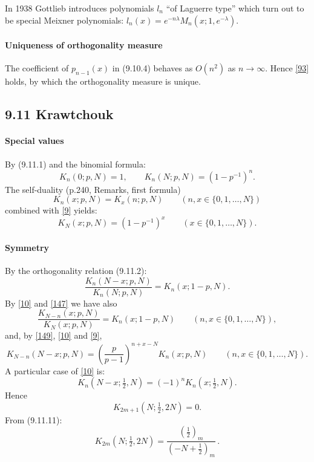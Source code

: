 \documentclass[twoside,11pt]{article}
\newcommand\la\lambda
\newcommand\thalf{\tfrac12}
\newcommand\iy\infty
\begin{document}
In 1938 Gottlieb \cite[\S2]{K1} introduces polynomials $l_n$ ``of Laguerre type''
which turn out to be special Meixner polynomials:
$l_n(x)=e^{-n\la} M_n(x;1,e^{-\la})$.
%
\paragraph{Uniqueness of orthogonality measure}
The coefficient of $p_{n-1}(x)$ in (9.10.4) behaves as $O(n^2)$ as $n\to\iy$.
Hence \eqref{93} holds, by which the orthogonality measure is unique.
%
\subsection*{9.11 Krawtchouk}
\label{sec9.11}
%
\paragraph{Special values}
By (9.11.1) and the binomial formula:
\begin{equation}
K_n(0;p,N)=1,\qquad
K_n(N;p,N)=(1-p^{-1})^n.
\label{9}
\end{equation}
The self-duality (p.240, Remarks, first formula)
\begin{equation}
K_n(x;p,N)=K_x(n;p,N)\qquad (n,x\in \{0,1,\ldots,N\})
\label{147}
\end{equation}
combined with \eqref{9} yields:
\begin{equation}
K_N(x;p,N)=(1-p^{-1})^x\qquad(x\in\{0,1,\ldots,N\}).
\label{148}
\end{equation}
%
\paragraph{Symmetry}
By the orthogonality relation (9.11.2):
\begin{equation}
\frac{K_n(N-x;p,N)}{K_n(N;p,N)}=K_n(x;1-p,N).
\label{10}
\end{equation}
By \eqref{10} and \eqref{147} we have also
\begin{equation}
\frac{K_{N-n}(x;p,N)}{K_N(x;p,N)}=K_n(x;1-p,N)
\qquad(n,x\in\{0,1,\ldots,N\}),
\label{149}
\end{equation}
and, by \eqref{149}, \eqref{10} and \eqref{9},
\begin{equation}
K_{N-n}(N-x;p,N)=\left(\frac p{p-1}\right)^{n+x-N}K_n(x;p,N)
\qquad(n,x\in\{0,1,\ldots,N\}).
\label{150}
\end{equation}
A particular case of \eqref{10} is:
\begin{equation}
K_n(N-x;\thalf,N)=(-1)^n K_n(x;\thalf,N).
\label{11}
\end{equation}
Hence
\begin{equation}
K_{2m+1}(N;\thalf,2N)=0.
\label{12}
\end{equation}
From (9.11.11):
\begin{equation}
K_{2m}(N;\thalf,2N)=\frac{(\thalf)_m}{(-N+\thalf)_m}\,.
\label{13}
\end{equation}
%
\end{document}
